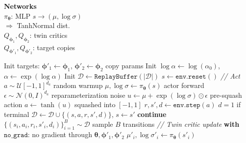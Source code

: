 \documentclass[11pt]{article}
\begin{document}
\begin{algorithm}[p]
\begin{minipage}[t]{0.28\linewidth}
\vspace{6pt}
\textbf{Networks} \\[2pt]
$\pi_{\boldsymbol{\theta}}$: MLP $s \to (\mu, \log\sigma)$ \\
\hspace*{1em}$\Rightarrow$ TanhNormal dist. \\
$Q_{\boldsymbol{\phi}_1}, Q_{\boldsymbol{\phi}_2}$: twin critics \\
$Q_{\boldsymbol{\phi}'_1}, Q_{\boldsymbol{\phi}'_2}$: target copies
\end{minipage}%
\hfill
\vrule
\hfill
\begin{minipage}[t]{0.68\linewidth}
\begin{algorithmic}[1]
\State Init targets: $\boldsymbol{\phi}'_1 \gets \boldsymbol{\phi}_1$, \; $\boldsymbol{\phi}'_2 \gets \boldsymbol{\phi}_2$ \hfill copy params
\State Init $\log\alpha \gets \log(\alpha_0)$, \; $\alpha \gets \exp(\log\alpha)$
\State Init $\mathcal{D} \gets \texttt{ReplayBuffer}(|\mathcal{D}|)$
    \State $s \gets \texttt{env.reset}()$
        \Statex \hspace{\algorithmicindent}\hspace{\algorithmicindent}\hspace{\algorithmicindent}\textit{// Act}
            \State $a \sim \mathcal{U}[-1, 1]^{d_a}$ \hfill random warmup
        \Else
            \State $\mu, \log\sigma \gets \pi_{\boldsymbol{\theta}}(s)$ \hfill actor forward
            \State $\epsilon \sim \mathcal{N}(0, I)^{d_a}$ \hfill reparameterization noise
            \State $u \gets \mu + \exp(\log\sigma) \odot \epsilon$ \hfill pre-squash action
            \State $a \gets \tanh(u)$ \hfill squashed into $[-1, 1]$
        \EndIf
        \State $r, s', d \gets \texttt{env.step}(a)$ \hfill $d = 1$ if terminal
        \State $\mathcal{D} \gets \mathcal{D} \cup \{(s, a, r, s', d)\}$, \; $s \gets s'$
         \textbf{continue} \EndIf
        \State $\{(s_i, a_i, r_i, s'_i, d_i)\}_{i=1}^B \sim \mathcal{D}$ \hfill sample $B$ transitions
        \Statex \hspace{\algorithmicindent}\hspace{\algorithmicindent}\hspace{\algorithmicindent}\textit{// Twin critic update}
        \State \textbf{with} $\texttt{no\_grad}$: \hfill no gradient through $\boldsymbol{\theta}, \boldsymbol{\phi}'_1, \boldsymbol{\phi}'_2$
        \State \hspace{\algorithmicindent} $\mu'_i, \log\sigma'_i \gets \pi_{\boldsymbol{\theta}}(s'_i)$

\end{algorithmic}
\end{minipage}
\end{algorithm}
\end{document}
